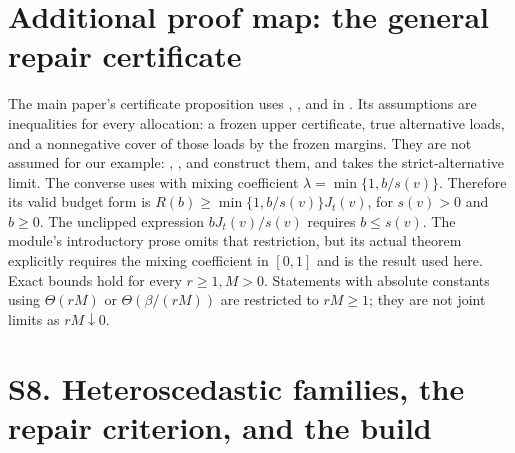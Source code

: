 \section*{Additional proof map: the general repair certificate}
The main paper's certificate proposition uses , ,
 and  in .
Its assumptions are inequalities for every allocation: a frozen upper certificate, true
alternative loads, and a nonnegative cover of those loads by the frozen margins.
They are not assumed for our example: , ,
 and  construct them, and
 takes the strict-alternative limit.
The converse uses  with mixing coefficient
$\lambda=\min\{1,b/s(v)\}$. Therefore its valid budget form is
$R(b)\ge\min\{1,b/s(v)\}J_t(v)$, for $s(v)>0$ and $b\ge0$.
The unclipped expression $bJ_t(v)/s(v)$ requires $b\le s(v)$.
The module's introductory prose omits that restriction, but its actual theorem explicitly
requires the mixing coefficient in $[0,1]$ and is the result used here.
Exact bounds hold for every $r\ge1,M>0$. Statements with absolute constants using
$\Theta(rM)$ or $\Theta(\beta/(rM))$ are restricted to $rM\ge1$; they are not joint limits
as $rM\downarrow0$.

\section{S8. Heteroscedastic families, the repair criterion, and the build}

